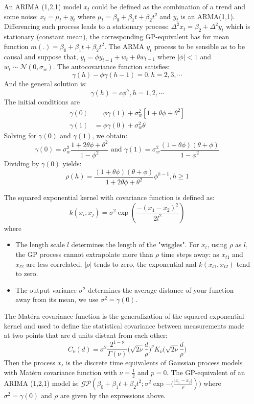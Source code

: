 \documentclass[12pt]{article}
\begin{document}
An ARIMA (1,2,1) model $x_t$ could be defined as the combination of a trend and some noise: $x_t = \mu_t + y_t$ where $\mu_t = \beta_0 + \beta_1 t + \beta_2 t^2$ and $y_t$ is an ARMA(1,1).
Differencing such process leads to a stationary process: $\Delta^2 x_t = \beta_2 + \Delta^2 y_t $ which is stationary (constant mean), the corresponding GP-equivalent has for mean function 
$m(.) =  \beta_0 + \beta_1 t + \beta_2 t^2$.
The ARMA $y_t$ process to be sensible as to be causal and suppose that, $y_t = \phi y_{t-1} + w_t + \theta w_{t-1}$ where $|\phi|<1$ and $w_t \sim \mathcal{N}(0, \sigma_w)$. 
The autocovariance function satisfies:
\[
	\gamma(h) -\phi \gamma(h-1)	= 0, h=2,3,\cdots
\]
And the general solution is:
\[
	\gamma(h) = c \phi^h, h=1,2,\cdots
\]
The initial conditions are 
\begin{align*}
	\gamma(0)	&=		\phi \gamma(1) + \sigma_w^2 [1 + \theta \phi + \theta^2] \\
	\gamma(1)	&=		\phi \gamma(0) + \sigma_w^2 \theta
\end{align*}
Solving for $\gamma(0)$ and $\gamma(1)$, we obtain: 
$$ \gamma(0) = \sigma_w^2 \frac{1 + 2 \theta \phi + \theta^2}{1 - \phi^2} \text{ and } \gamma(1) = \sigma_w^2 \frac{ (1 + \theta \phi) (\theta + \phi)}{1 - \phi^2}$$
Dividing by $\gamma(0)$ yields:
\[
	\rho(h) = \frac{ (1 + \theta \phi)  (\theta + \phi) } {  1 + 2 \theta \phi + \theta^2 } \phi^{h-1}, h \ge 1
\]

The squared exponential kernel with covariance function is defined as:
\[
	k(x_i, x_j) = \sigma^2 \exp{( \frac{- (x_1-x_2)^2 } {2 l^2 }	)}
\]
where
\begin{itemize}
	\item The length scale $l$ determines the length of the "wiggles". For $x_t$, using $\rho$ as $l$,  the GP process cannot extrapolate more than $\rho$ time steps away:
	as $x_{t1}$ and $x_{t2}$ are less correlated,  $|\rho|$  tends to zero, the exponential and $k(x_{t1}, x_{t2})$ tend to zero.
	
	\item The output variance $\sigma^2$ determines the average distance of your function away from its mean, we use  $\sigma^2 = \gamma(0)$.
\end{itemize}

The Matérn covariance function is the generalization of the squared exponential kernel and used 
to define the statistical covariance between measurements made at two points that are d units distant from each other:
\[
	C_\nu(d) = \sigma^2 \frac{2^{1-\nu}}{\Gamma(\nu)} \big( \sqrt{2 \nu}	\frac{d}{\rho} \big)^\nu K_{\nu} \big(	\sqrt{2 \nu} \frac{d}{\rho}  \big)
\]
Then the process $x_t$ is the discrete time equivalents of Gaussian process models with Matérn covariance function with $\nu = \frac{1}{2}$ and $p=0$.
 The GP-equivalent of an ARIMA (1,2,1) model is: $ \mathcal{GP}( \beta_0 + \beta_1 t + \beta_2 t^2; \sigma^2 \exp{- (\frac{ |x_1-x_2| } {\rho}}) )$ where $\sigma^2 = \gamma(0)$ 
 and $\rho$ are given by the expressions above. 
\end{document}

